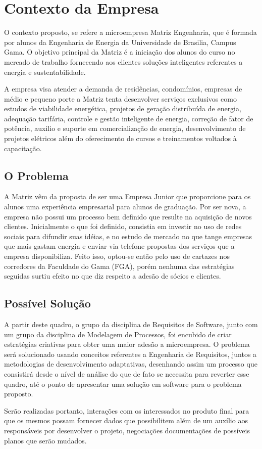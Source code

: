 \chapter[Contexto da Empresa]{Contexto da Empresa}
O contexto proposto, se refere a microempresa Matriz Engenharia, que é formada por alunos da Engenharia de Energia da Universidade de Brasilia, Campus Gama. O objetivo principal da Matriz é a iniciação dos alunos do curso no mercado de trabalho fornecendo aos clientes soluções inteligentes referentes a energia e sustentabilidade.

A empresa visa atender a demanda de residências, condomínios, empresas de médio e pequeno porte a Matriz tenta desenvolver serviços exclusivos como estudos de viabilidade energética, projetos de geração distribuída de energia, adequação tarifária, controle e gestão inteligente de energia, correção de fator de potência, auxilio e suporte em comercialização de energia, desenvolvimento de projetos elétricos além do oferecimento de cursos e treinamentos voltados à capacitação.

\section{O Problema}
A Matriz vêm da proposta de ser uma Empresa Junior que proporcione para os alunos uma experiência empresarial para alunos de graduação. Por ser nova, a empresa não possui um processo bem definido que resulte na aquisição de novos clientes. Inicialmente o que foi definido, consistia em investir no uso de redes sociais para difundir suas idéias, e no estudo de mercado no que tange empresas que mais gastam energia e enviar via telefone propostas dos serviços que a empresa disponibiliza. Feito isso, optou-se então pelo uso de cartazes nos corredores da Faculdade do Gama (FGA), porém nenhuma das estratégias seguidas surtiu efeito no que diz respeito a adesão de sócios e clientes.

\section{Possível Solução}
A partir deste quadro, o grupo da disciplina de Requisitos de Software, junto com um grupo da disciplina de Modelagem de Processos, foi encubido de criar estratégias criativas para obter uma maior adesão a microempresa. O problema será solucionado usando conceitos referentes a Engenharia de Requisitos, juntos a metodologias de desenvolvimento adaptativas, desenhando assim um processo que consistirá desde o nível de análise do que de fato se necessita para reverter esse quadro, até o ponto de apresentar uma solução em software para o problema proposto.

Serão realizadas portanto, interações com os interessados no produto final para que os mesmos possam fornecer dados que possibilitem além de um auxílio aos responsáveis por desenvolver o projeto, negociações documentações de possíveis planos que serão mudados.
